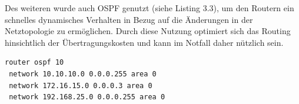 Des weiteren wurde auch \ac{OSPF} genutzt (siehe Listing 3.3), um  den Routern ein schnelles dynamisches Verhalten in Bezug auf die Änderungen in der Netztopologie zu ermöglichen. Durch diese Nutzung optimiert sich das Routing hinsichtlich der Übertragungskosten und kann im Notfall daher nützlich sein.

\begin{lstlisting}[caption={OSFP Einstellungen auf Router 2},label={lst:ospfsettings},language={}]
router ospf 10
 network 10.10.10.0 0.0.0.255 area 0
 network 172.16.15.0 0.0.0.3 area 0
 network 192.168.25.0 0.0.0.255 area 0

\end{lstlisting}

